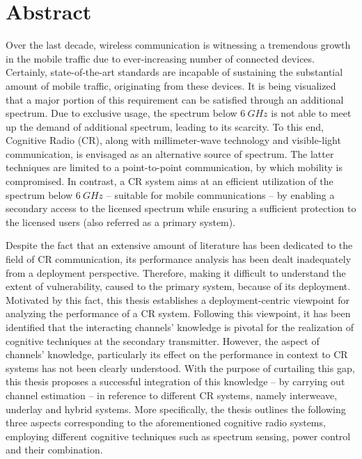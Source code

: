 
\chapter*{Abstract}
Over the last decade, wireless communication is witnessing a tremendous growth in the mobile traffic due to ever-increasing number of connected devices. Certainly, state-of-the-art standards are incapable of sustaining the substantial amount of mobile traffic, originating from these devices. It is being visualized that a major portion of this requirement can be satisfied through an additional spectrum. Due to exclusive usage, the spectrum below $\SI{6}{GHz}$ is not able to meet up the demand of additional spectrum, leading to its scarcity. To this end, Cognitive Radio (CR), along with millimeter-wave technology and visible-light communication, is envisaged as an alternative source of spectrum. The latter techniques are limited to a point-to-point communication, by which mobility is compromised. In contrast, a CR system aims at an efficient utilization of the spectrum below $\SI{6}{GHz}$ -- suitable for mobile communications -- by enabling a secondary access to the licensed spectrum while ensuring a sufficient protection to the licensed users (also referred as a primary system). %


Despite the fact that an extensive amount of literature has been dedicated to the field of CR communication, its performance analysis has been dealt inadequately from a deployment perspective. Therefore, making it difficult to understand the extent of vulnerability, caused to the primary system, because of its deployment. Motivated by this fact, this thesis establishes a deployment-centric viewpoint for analyzing the performance of a CR system. Following this viewpoint, it has been identified that the interacting channels' knowledge is pivotal for the realization of cognitive techniques at the secondary transmitter. However, the aspect of channels' knowledge, particularly its effect on the performance in context to CR systems has not been clearly understood. With the purpose of curtailing this gap, this thesis proposes a successful integration of this knowledge -- by carrying out channel estimation -- in reference to different CR systems, namely interweave, underlay and hybrid systems. More specifically, the thesis outlines the following three aspects corresponding to the aforementioned cognitive radio systems, employing different cognitive techniques such as spectrum sensing, power control and their combination.

